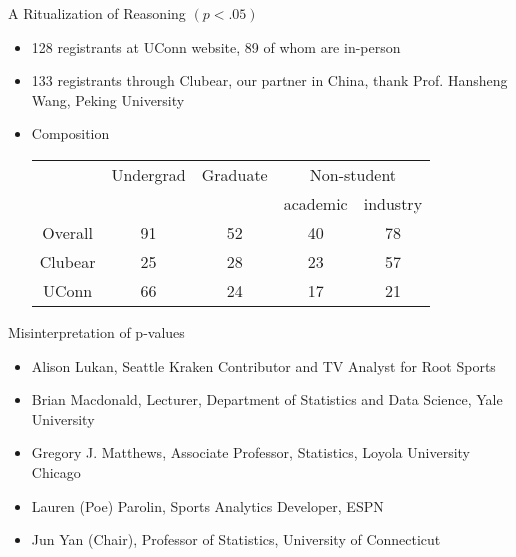 \documentclass[aspectratio=169, 12pt]{beamer}
\begin{document}
\begin{frame}{A Ritualization of Reasoning $(p < .05)$}
  \begin{itemize}
  \item 128 registrants at UConn website, 89 of whom are in-person
  \item 133 registrants through Clubear, our partner in China, thank
    Prof. Hansheng Wang, Peking University
  \item Composition
    \begin{tabular}{ccccc}
      \toprule
      &   Undergrad & Graduate & \multicolumn{2}{c}{Non-student} \\
      \cmidrule{4-5}
      &   &  & academic &  industry\\
      \midrule
      Overall &  91      & 52           & 40            & 78\\
      Clubear   &  25      & 28           & 23            & 57\\
      UConn    &  66      & 24           & 17            & 21\\
      \bottomrule
    \end{tabular}
  \end{itemize}
\end{frame}

\begin{frame}{Misinterpretation of p-values}
\begin{itemize} %
\item
Alison Lukan, Seattle Kraken Contributor and TV Analyst for Root
 Sports
 \item
 Brian Macdonald, Lecturer, Department of Statistics and Data
 Science, Yale University
\item
Gregory J. Matthews, Associate Professor, Statistics, Loyola
University Chicago
\item  
Lauren (Poe) Parolin, Sports Analytics Developer, ESPN
\item
 Jun Yan (Chair), Professor of Statistics, University of Connecticut
 \end{itemize}
\end{frame}
\end{document}
